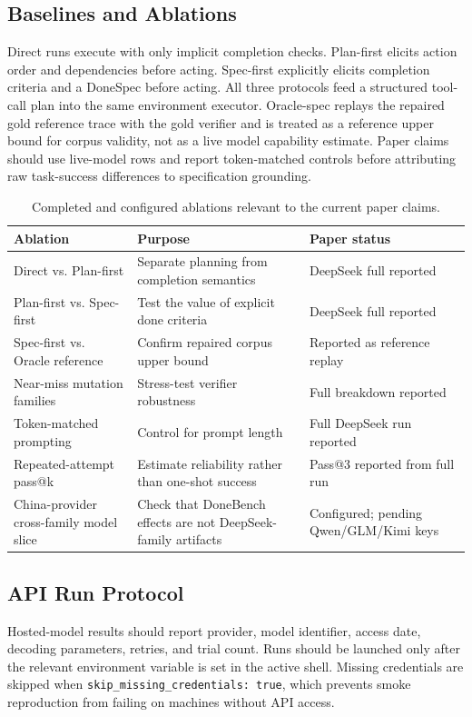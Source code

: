 \subsection{Baselines and Ablations}

Direct runs execute with only implicit completion checks. Plan-first elicits action order and dependencies before acting. Spec-first explicitly elicits completion criteria and a DoneSpec before acting. All three protocols feed a structured tool-call plan into the same environment executor. Oracle-spec replays the repaired gold reference trace with the gold verifier and is treated as a reference upper bound for corpus validity, not as a live model capability estimate. Paper claims should use live-model rows and report token-matched controls before attributing raw task-success differences to specification grounding.

\begin{table}[tbp]
\centering
\small
\begin{tabularx}{\linewidth}{lX X}
\toprule
Ablation & Purpose & Paper status \\
\midrule
Direct vs. Plan-first & Separate planning from completion semantics & DeepSeek full reported \\
Plan-first vs. Spec-first & Test the value of explicit done criteria & DeepSeek full reported \\
Spec-first vs. Oracle reference & Confirm repaired corpus upper bound & Reported as reference replay \\
Near-miss mutation families & Stress-test verifier robustness & Full breakdown reported \\
Token-matched prompting & Control for prompt length & Full DeepSeek run reported \\
Repeated-attempt pass@k & Estimate reliability rather than one-shot success & Pass@3 reported from full run \\
China-provider cross-family model slice & Check that DoneBench effects are not DeepSeek-family artifacts & Configured; pending Qwen/GLM/Kimi keys \\
\bottomrule
\end{tabularx}
\caption{Completed and configured ablations relevant to the current paper claims.}
\end{table}

\subsection{API Run Protocol}

Hosted-model results should report provider, model identifier, access date, decoding parameters, retries, and trial count. Runs should be launched only after the relevant environment variable is set in the active shell. Missing credentials are skipped when \texttt{skip\_missing\_credentials: true}, which prevents smoke reproduction from failing on machines without API access.
